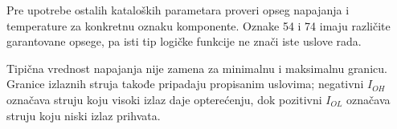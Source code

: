 Pre upotrebe ostalih kataloških parametara proveri opseg napajanja i temperature za konkretnu oznaku komponente. Oznake 54 i 74 imaju različite garantovane opsege, pa isti tip logičke funkcije ne znači iste uslove rada.

Tipična vrednost napajanja nije zamena za minimalnu i maksimalnu granicu. Granice izlaznih struja takođe pripadaju propisanim uslovima; negativni $I_{OH}$ označava struju koju visoki izlaz daje opterećenju, dok pozitivni $I_{OL}$ označava struju koju niski izlaz prihvata.

